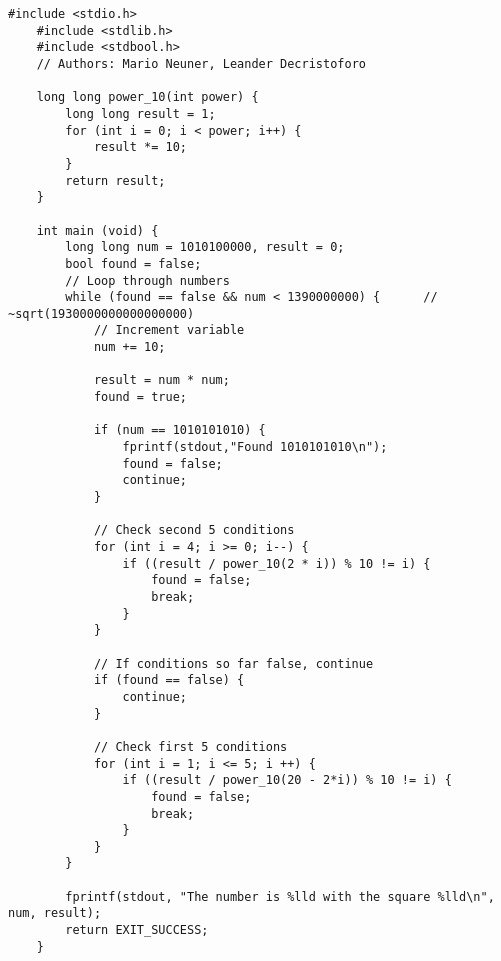 \documentclass[12pt,a4paper]{article}
\begin{document}
\vspace{3em}
\begin{lstlisting}[caption={Gapped square},label={lst:p7001}]
    #include <stdio.h>
    #include <stdlib.h>
    #include <stdbool.h>
    // Authors: Mario Neuner, Leander Decristoforo

    long long power_10(int power) {
        long long result = 1;
        for (int i = 0; i < power; i++) {
            result *= 10;
        }
        return result;
    }

    int main (void) {
        long long num = 1010100000, result = 0;
        bool found = false;
        // Loop through numbers
        while (found == false && num < 1390000000) {      // ~sqrt(1930000000000000000)
            // Increment variable
            num += 10;

            result = num * num;
            found = true;

            if (num == 1010101010) {
                fprintf(stdout,"Found 1010101010\n");
                found = false;
                continue;
            }

            // Check second 5 conditions
            for (int i = 4; i >= 0; i--) {
                if ((result / power_10(2 * i)) % 10 != i) {
                    found = false;
                    break;
                }
            }

            // If conditions so far false, continue
            if (found == false) {
                continue;
            }

            // Check first 5 conditions
            for (int i = 1; i <= 5; i ++) {
                if ((result / power_10(20 - 2*i)) % 10 != i) {
                    found = false;
                    break;
                }
            }
        }

        fprintf(stdout, "The number is %lld with the square %lld\n", num, result);
        return EXIT_SUCCESS;
    }
\end{lstlisting}
\end{document}
